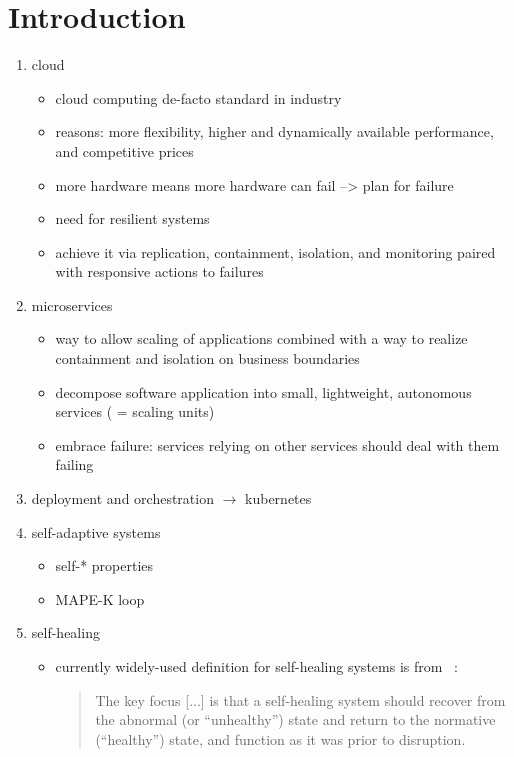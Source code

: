 
\section{Introduction}\label{sec:introduction}

\begin{enumerate}
  \item cloud
  \begin{itemize}
    \item cloud computing de-facto standard in industry
    \item reasons: more flexibility, higher and dynamically available performance, and competitive prices~\cite{ToffettiMicroservices}
    \item more hardware means more hardware can fail --> plan for failure~\cite{microservices}
    \item need for resilient systems~\cite{reactivemanifesto}
    \item achieve it via replication, containment, isolation, and monitoring paired with responsive actions to failures
  \end{itemize}
  
  \item microservices
  \begin{itemize}
    \item way to allow scaling of applications combined with a way to realize containment and isolation on business boundaries
    \item decompose software application into small, lightweight, autonomous services ( = scaling units)
    \item embrace failure: services relying on other services should deal with them failing~\cite{microservices}
  \end{itemize}
  
  \item deployment and orchestration $\rightarrow$ \gls{kubernetes}
  
  \item self-adaptive systems
  \begin{itemize}
    \item self-* properties
    \item MAPE-K loop
  \end{itemize}
  
  \item self-healing
  \begin{itemize}
    \item currently widely-used definition for self-healing systems is from \citeauthor{Ghosh}~\cite{Ghosh}:
    \begin{quote}
      The key focus [...] is that a self-healing system should recover from the abnormal (or \enquote{unhealthy}) state and return to the normative (\enquote{healthy}) state, and function as it was prior to disruption.
    \end{quote}
    

\end{itemize}
\end{enumerate}
